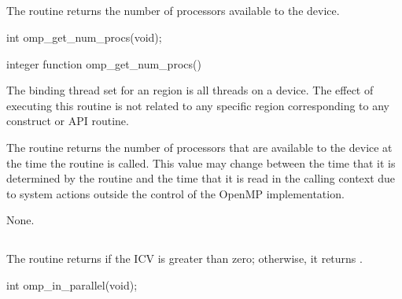 \subsection{}
\label{subsec:omp_get_num_procs}
\summary
The  routine returns the number of processors available to the 
device.

\format
\begin{ccppspecific}
\begin{ompcFunction}
int omp_get_num_procs(void);
\end{ompcFunction}
\end{ccppspecific}

\begin{fortranspecific}
\begin{ompfFunction}
integer function omp_get_num_procs()
\end{ompfFunction}
\end{fortranspecific}

\binding
The binding thread set for an  region is all threads on a device. 
The effect of executing this routine is not related to any specific region corresponding to 
any construct or API routine.

\effect
The  routine returns the number of processors that are available 
to the device at the time the routine is called. This value may change between 
the time that it is determined by the  routine and the time that it 
is read in the calling context due to system actions outside the control of the OpenMP 
implementation.

\crossreferences
None.







\subsection{}
\label{subsec:omp_in_parallel}
\summary
The  routine returns  if the  ICV is greater 
than zero; otherwise, it returns .

\pagebreak
\format
\begin{ccppspecific}
\begin{ompcFunction}
int omp_in_parallel(void);
\end{ompcFunction}
\end{ccppspecific}

